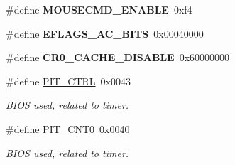 \begin{DoxyCompactItemize}
\item 
\hypertarget{group__hal_gadb0b2b20b6a3796574c3fd7c3c22f549}{}\#define {\bfseries M\+O\+U\+S\+E\+C\+M\+D\+\_\+\+E\+N\+A\+B\+L\+E}~0xf4\label{group__hal_gadb0b2b20b6a3796574c3fd7c3c22f549}

\item 
\hypertarget{group__hal_ga81d4706a741fd9db65d8af831fc3e282}{}\#define {\bfseries E\+F\+L\+A\+G\+S\+\_\+\+A\+C\+\_\+\+B\+I\+T\+S}~0x00040000\label{group__hal_ga81d4706a741fd9db65d8af831fc3e282}

\item 
\hypertarget{group__hal_gaa4f66a4fbbc03e7c8ce7dfe56d3184a7}{}\#define {\bfseries C\+R0\+\_\+\+C\+A\+C\+H\+E\+\_\+\+D\+I\+S\+A\+B\+L\+E}~0x60000000\label{group__hal_gaa4f66a4fbbc03e7c8ce7dfe56d3184a7}

\item 
\hypertarget{group__hal_ga92ff76b55680dfe73f95c2031d122c88}{}\#define \hyperlink{group__hal_ga92ff76b55680dfe73f95c2031d122c88}{P\+I\+T\+\_\+\+C\+T\+R\+L}~0x0043\label{group__hal_ga92ff76b55680dfe73f95c2031d122c88}

\begin{DoxyCompactList}\small\item\em B\+I\+O\+S used, related to timer. \end{DoxyCompactList}\item 
\hypertarget{group__hal_ga09e4f04647b9697c00fd5c4a20b73c2a}{}\#define \hyperlink{group__hal_ga09e4f04647b9697c00fd5c4a20b73c2a}{P\+I\+T\+\_\+\+C\+N\+T0}~0x0040\label{group__hal_ga09e4f04647b9697c00fd5c4a20b73c2a}

\begin{DoxyCompactList}\small\item\em B\+I\+O\+S used, related to timer. \end{DoxyCompactList}\end{DoxyCompactItemize}
